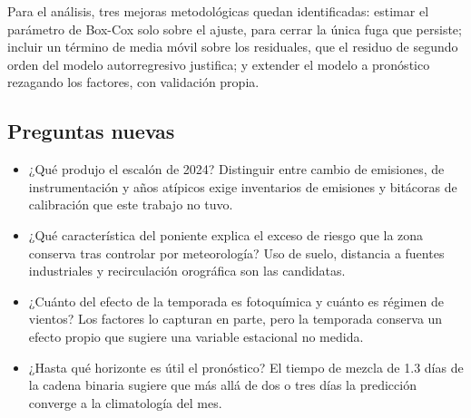 Para el análisis, tres mejoras metodológicas quedan identificadas: estimar
el parámetro de Box-Cox solo sobre el ajuste, para cerrar la única fuga que
persiste; incluir un término de media móvil sobre los residuales, que el
residuo de segundo orden del modelo autorregresivo justifica; y extender el
modelo a pronóstico rezagando los factores, con validación propia.

\subsection{Preguntas nuevas}

\begin{itemize}
  \item ¿Qué produjo el escalón de 2024? Distinguir entre cambio de
    emisiones, de instrumentación y años atípicos exige inventarios de
    emisiones y bitácoras de calibración que este trabajo no tuvo.
  \item ¿Qué característica del poniente explica el exceso de riesgo que
    la zona conserva tras controlar por meteorología? Uso de suelo,
    distancia a fuentes industriales y recirculación orográfica son las
    candidatas.
  \item ¿Cuánto del efecto de la temporada es fotoquímica y cuánto es
    régimen de vientos? Los factores lo capturan en parte, pero la temporada
    conserva un efecto propio que sugiere una variable estacional no medida.
  \item ¿Hasta qué horizonte es útil el pronóstico? El tiempo de mezcla de
    1.3 días de la cadena binaria sugiere que más allá de dos o tres días la
    predicción converge a la climatología del mes.
\end{itemize}
